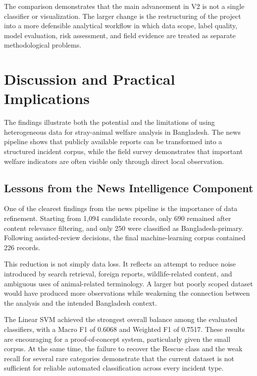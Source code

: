 \documentclass[conference]{IEEEtran}
\begin{document}
The comparison demonstrates that the main advancement in V2 is not a single
classifier or visualization. The larger change is the restructuring of the
project into a more defensible analytical workflow in which data scope,
label quality, model evaluation, risk assessment, and field evidence are
treated as separate methodological problems.


\section{Discussion and Practical Implications}

The findings illustrate both the potential and the limitations of using
heterogeneous data for stray-animal welfare analysis in Bangladesh. The news
pipeline shows that publicly available reports can be transformed into a
structured incident corpus, while the field survey demonstrates that
important welfare indicators are often visible only through direct local
observation.

\subsection{Lessons from the News Intelligence Component}

One of the clearest findings from the news pipeline is the importance of data
refinement. Starting from 1,094 candidate records, only 690 remained after
content relevance filtering, and only 250 were classified as
Bangladesh-primary. Following assisted-review decisions, the final
machine-learning corpus contained 226 records.

This reduction is not simply data loss. It reflects an attempt to reduce
noise introduced by search retrieval, foreign reports, wildlife-related
content, and ambiguous uses of animal-related terminology. A larger but
poorly scoped dataset would have produced more observations while weakening
the connection between the analysis and the intended Bangladesh context.

The Linear SVM achieved the strongest overall balance among the evaluated
classifiers, with a Macro F1 of 0.6068 and Weighted F1 of 0.7517. These
results are encouraging for a proof-of-concept system, particularly given
the small corpus. At the same time, the failure to recover the Rescue class
and the weak recall for several rare categories demonstrate that the current
dataset is not sufficient for reliable automated classification across every
incident type.
\end{document}
